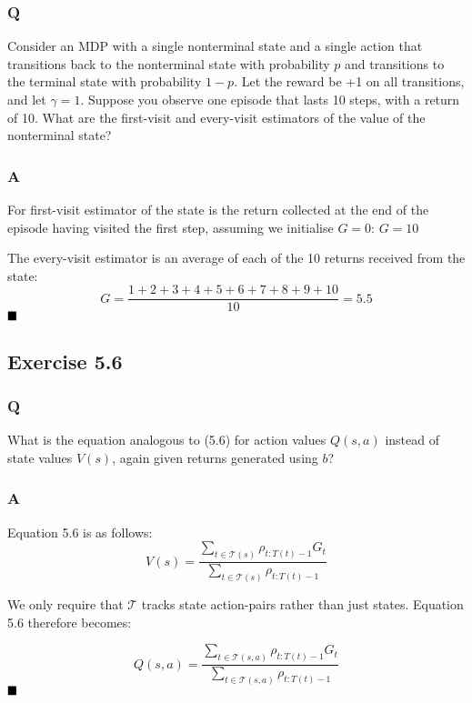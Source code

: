 \subsubsection{Q}
Consider an MDP with a single nonterminal state and a single action that transitions back to the nonterminal state with probability $p$ and transitions to the terminal state with probability $1 - p$. Let the reward be +1 on all transitions, and let $\gamma = 1$. Suppose you observe one episode that lasts 10 steps, with a return of 10. What are the first-visit and every-visit estimators of the value of the nonterminal state?
\subsubsection{A}
For first-visit estimator of the state is the return collected at the end of the episode having visited the first step, assuming we initialise $G=0$:
$
G = 10
$

The every-visit estimator is an average of each of the 10 returns received from the state:
\begin{equation}
G = \frac{1+2+3+4+5+6+7+8+9+10}{10} = 5.5
\end{equation}
$
\hfill \blacksquare
$

\subsection{Exercise 5.6}
\subsubsection{Q}
What is the equation analogous to (5.6) for action values $Q(s,a)$ instead of state values $V(s)$, again given returns generated using $b$?
\subsubsection{A}
Equation 5.6 is as follows:
\begin{equation}
V(s) = \frac{\sum_{t \in \mathcal{T}(s)} \rho_{t:T(t)-1} G_t}{\sum_{t \in \mathcal{T}(s)} \rho_{t:T(t)-1}}
\end{equation}

We only require that $\mathcal{T}$ tracks state action-pairs rather than just states. Equation 5.6 therefore becomes: 

\begin{equation}
Q(s,a) = \frac{\sum_{t \in \mathcal{T}(s,a)} \rho_{t:T(t)-1} G_t}{\sum_{t \in \mathcal{T}(s,a)} \rho_{t:T(t)-1}}
\end{equation}
$
\hfill \blacksquare
$

